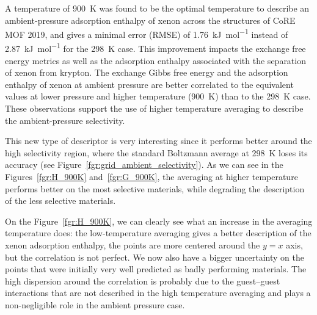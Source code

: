 \documentclass[main]{subfiles}
\begin{document}
A temperature of \SI{900}{\kelvin} was found to be the optimal temperature to describe an ambient-pressure adsorption enthalpy of xenon across the structures of CoRE MOF 2019, and gives a minimal error (RMSE) of \SI{1.76}{\kilo\joule\per\mole} instead of \SI{2.87}{\kilo\joule\per\mole} for the \SI{298}{\kelvin} case. This improvement impacts the exchange free energy metrics as well as the adsorption enthalpy associated with the separation of xenon from krypton. The exchange Gibbs free energy and the adsorption enthalpy of xenon at ambient pressure are better correlated to the equivalent values at lower pressure and higher temperature (\SI{900}{\kelvin}) than to the \SI{298}{\kelvin} case. These observations support the use of higher temperature averaging to describe the ambient-pressure selectivity.

This new type of descriptor is very interesting since it performs better around the high selectivity region, where the standard Boltzmann average at \SI{298}{\kelvin} loses its accuracy (see Figure~\ref{fgr:grid_ambient_selectivity}). As we can see in the Figures~\ref{fgr:H_900K} and~\ref{fgr:G_900K}, the averaging at higher temperature performs better on the most selective materials, while degrading the description of the less selective materials.

On the Figure~\ref{fgr:H_900K}, we can clearly see what an increase in the averaging temperature does: the low-temperature averaging gives a better description of the xenon adsorption enthalpy, the points are more centered around the $y=x$ axis, but the correlation is not perfect. We now also have a bigger uncertainty on the points that were initially very well predicted as badly performing materials. The high dispersion around the correlation is probably due to the guest--guest interactions that are not described in the high temperature averaging and plays a non-negligible role in the ambient pressure case.
\end{document}

